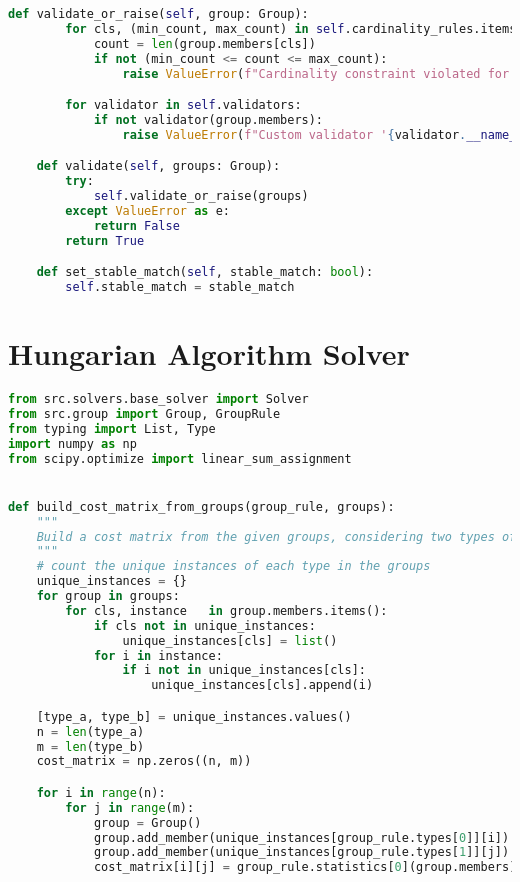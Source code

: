 \begin{apendicesenv}
\begin{lstlisting}[language=Python, caption={GroupRule and Group Class Source Code}]
    def validate_or_raise(self, group: Group):
        for cls, (min_count, max_count) in self.cardinality_rules.items():
            count = len(group.members[cls])
            if not (min_count <= count <= max_count):
                raise ValueError(f"Cardinality constraint violated for class {cls.__name__}: found {count}, expected from {min_count} to {max_count}.")

        for validator in self.validators:
            if not validator(group.members):
                raise ValueError(f"Custom validator '{validator.__name__}' failed.")

    def validate(self, groups: Group):
        try:
            self.validate_or_raise(groups)
        except ValueError as e:
            return False
        return True

    def set_stable_match(self, stable_match: bool):
        self.stable_match = stable_match
\end{lstlisting}

\chapter{Hungarian Algorithm Solver}
\label{app:solver_hungarian}
\begin{lstlisting}[language=Python, caption={Hungarian Algorithm Solver Source Code}]
from src.solvers.base_solver import Solver
from src.group import Group, GroupRule
from typing import List, Type
import numpy as np
from scipy.optimize import linear_sum_assignment


def build_cost_matrix_from_groups(group_rule, groups):
    """
    Build a cost matrix from the given groups, considering two types of objects.
    """
    # count the unique instances of each type in the groups
    unique_instances = {}
    for group in groups:
        for cls, instance   in group.members.items():
            if cls not in unique_instances:
                unique_instances[cls] = list()
            for i in instance:
                if i not in unique_instances[cls]:
                    unique_instances[cls].append(i)

    [type_a, type_b] = unique_instances.values()
    n = len(type_a)
    m = len(type_b)
    cost_matrix = np.zeros((n, m))

    for i in range(n):
        for j in range(m):
            group = Group()
            group.add_member(unique_instances[group_rule.types[0]][i])
            group.add_member(unique_instances[group_rule.types[1]][j])
            cost_matrix[i][j] = group_rule.statistics[0](group.members)
    

\end{lstlisting}
\end{apendicesenv}
